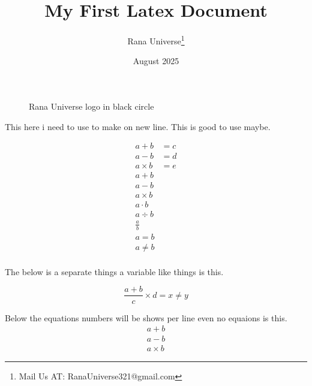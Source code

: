 \documentclass[12pt, letterpaper]{article}
\title{My First Latex Document}
\author{Rana Universe\thanks{Mail Us AT: RanaUniverse321@gmail.com}}
\date{August 2025}
\begin{document}
\maketitle






\begin{figure}[htbp]
\centering


\caption{Rana Universe logo in black circle}

\label{fig:rana-universe-logo}

\end{figure}


\newpage

This here i need to use to make on new line. This is good to use maybe.


$$
\begin{aligned}
a + b &= c \\
a - b &= d \\
a \times b &= e\\
a + b \\
a - b \\
a \times b \\
a \cdot b \\
a \div b \\
\frac{a}{b} \\
a = b \\
a \neq b \\
\end{aligned}
$$

The below is a separate things a variable like things is this.

$$
\frac{a+b}{c} \times d = x \neq y
$$




Below the equations numbers will be shows per line even no equaions is this.
\begin{align}
    a + b \\
    a - b \\
    a \times b
\end{align}
\end{document}
